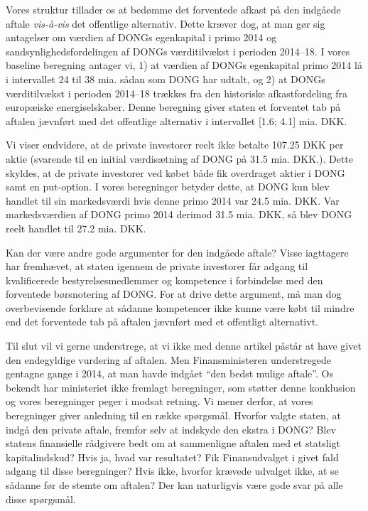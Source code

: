 \documentclass{article}
\begin{document}
Vores struktur tillader os at bedømme det forventede afkast på den indgåede aftale \emph{vis-\`{a}-vis} det offentlige alternativ. Dette kræver dog, at man gør sig antagelser om værdien af DONGs egenkapital i primo 2014 og sandsynlighedsfordelingen af DONGs  værditilvækst i perioden 2014--18. I vores baseline beregning antager vi, 1) at værdien af DONGs egenkapital primo 2014 lå i intervallet 24 til 38 mia. sådan som DONG har udtalt, og 2) at DONGs  værditilvækst i perioden 2014--18 trækkes fra den historiske afkastfordeling fra europæiske energiselskaber. Denne beregning giver staten et forventet tab på aftalen jævnført med det offentlige alternativ i intervallet [1.6; 4.1] mia. DKK. 

Vi viser endvidere, at de private investorer reelt ikke betalte 107.25 DKK per aktie (svarende til en initial værdisætning af DONG på 31.5 mia. DKK.). Dette skyldes, at de private investorer ved købet både fik overdraget  aktier i DONG samt en put-option. I vores beregninger betyder dette, at DONG kun blev handlet til sin markedsværdi hvis denne primo 2014 var 24.5 mia. DKK. Var markedsværdien af DONG primo 2014 derimod 31.5 mia. DKK, så blev DONG reelt handlet til 27.2 mia. DKK. 


Kan der være andre gode argumenter for den indgåede aftale? Visse iagttagere har fremhævet, at staten igennem de private investorer får adgang til kvalificerede bestyrelsesmedlemmer og kompetence i forbindelse med den forventede børsnotering af DONG. For at drive dette argument, må man dog overbevisende forklare at sådanne kompetencer ikke kunne være købt til mindre end  det forventede tab på aftalen jævnført med et offentligt alternativt. %

Til slut vil vi gerne understrege, at vi ikke med denne artikel påstår at have givet den endegyldige vurdering af aftalen. Men Finansministeren understregede gentagne gange i 2014, at man havde indgået \enquote{den bedst mulige aftale}. 
Os bekendt har ministeriet ikke fremlagt beregninger, som støtter denne konklusion og vores beregninger peger i modsat retning. Vi mener derfor, at vores beregninger giver anledning til en række spørgsmål. Hvorfor valgte staten, at indgå den private aftale, fremfor selv at indskyde den ekstra i DONG? Blev statens finansielle rådgivere bedt om at sammenligne aftalen med et statsligt kapitalindskud? Hvis ja, hvad var resultatet? Fik Finansudvalget i givet fald adgang til disse beregninger? Hvis ikke, hvorfor krævede udvalget ikke, at se sådanne før de stemte om aftalen? Der kan naturligvis være gode svar på alle disse spørgsmål. %
\end{document}
